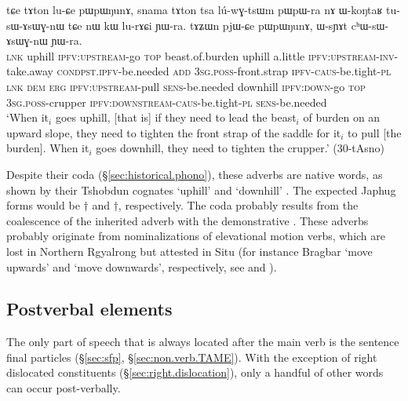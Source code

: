 \begin{exe}
\ex \label{ex:tAton.tAZWn}
\gll tɕe tɤton lu-ɕe pɯpɯŋunɤ, snama tɤton tsa lú-wɣ-tsɯm pɯ\redp{}pɯ-ra nɤ ɯ-koŋtaʁ tu-sɯ-ɤsɯɣ-nɯ tɕe nɯ kɯ lu-rɤɕi ɲɯ-ra.  tɤʑɯn pjɯ-ɕe pɯpɯŋunɤ, ɯ-sɲɤt cʰɯ-sɯ-ɤsɯɣ-nɯ ɲɯ-ra. \\
\textsc{lnk} uphill \textsc{ipfv}:\textsc{upstream}-go \textsc{top} beast.of.burden uphill a.little \textsc{ipfv}:\textsc{upstream}-\textsc{inv}-take.away \textsc{cond}\redp{}\textsc{pst}.\textsc{ipfv}-be.needed \textsc{add} \textsc{3sg}.\textsc{poss}-front.strap \textsc{ipfv}-\textsc{caus}-be.tight-\textsc{pl} \textsc{lnk} \textsc{dem} \textsc{erg} \textsc{ipfv}:\textsc{upstream}-pull \textsc{sens}-be.needed downhill \textsc{ipfv}:\textsc{down}-go \textsc{top} \textsc{3sg}.\textsc{poss}-crupper \textsc{ipfv}:\textsc{downstream}-\textsc{caus}-be.tight-\textsc{pl} \textsc{sens}-be.needed \\
\glt `When it$_i$ goes uphill, [that is] if they need to lead the beast$_i$ of burden on an upward slope, they need to tighten the front strap of the saddle for it$_i$ to pull [the burden]. When it$_i$ goes downhill, they need to tighten the crupper.'  (30-tAsno)
\end{exe}

Despite their  coda (§\ref{sec:historical.phono}), these adverbs are native words, as shown by their Tshobdun cognates  `uphill' and  `downhill' \citep[123--4]{jackson19tshobdun}. The expected Japhug forms would be $\dagger$ and $\dagger$, respectively. The coda  probably results from the coalescence of the inherited adverb with the demonstrative . These adverbs probably originate from nominalizations of elevational motion verbs, which are lost in Northern Rgyalrong but attested in Situ (for instance Bragbar  `move upwards' and
 `move downwards', respectively, see \citealt[§9.1]{zhangshuya20these} and \citealt{linyj17space}).

\subsection{Postverbal elements} \label{sec:postverbal.adv}
 
The only part of speech that is always located after the main verb is the sentence final particles (§\ref{sec:sfp}, §\ref{sec:non.verb.TAME}). With the exception of right dislocated constituents (§\ref{sec:right.dislocation}), only a handful of other words can occur post-verbally.

